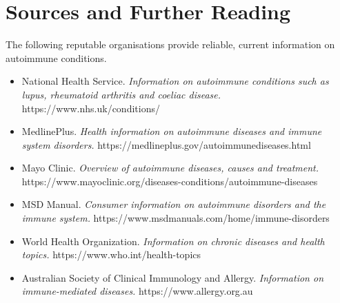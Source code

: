 \section*{Sources and Further Reading}
The following reputable organisations provide reliable, current information on autoimmune conditions.

\begin{itemize}
    \item National Health Service. \textit{Information on autoimmune conditions such as lupus, rheumatoid arthritis and coeliac disease.} https://www.nhs.uk/conditions/
    \item MedlinePlus. \textit{Health information on autoimmune diseases and immune system disorders.} https://medlineplus.gov/autoimmunediseases.html
    \item Mayo Clinic. \textit{Overview of autoimmune diseases, causes and treatment.} https://www.mayoclinic.org/diseases-conditions/autoimmune-diseases
    \item MSD Manual. \textit{Consumer information on autoimmune disorders and the immune system.} https://www.msdmanuals.com/home/immune-disorders
    \item World Health Organization. \textit{Information on chronic diseases and health topics.} https://www.who.int/health-topics
    \item Australian Society of Clinical Immunology and Allergy. \textit{Information on immune-mediated diseases.} https://www.allergy.org.au
\end{itemize}
